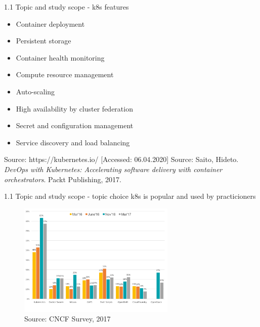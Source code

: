 \documentclass{beamer}
\begin{document}
\begin{frame}{1.1 Topic and study scope - k8s features}%
\begin{itemize}
	\item Container deployment
	\item Persistent storage
	\item Container health monitoring
	\item Compute resource management
	\item Auto-scaling
	\item High availability by cluster federation
	\item Secret and configuration management
	\item Service discovery and load balancing
\end{itemize}

\tiny{Source: https://kubernetes.io/ [Accessed: 06.04.2020]} 
\tiny{Source: Saito, Hideto. \textit{DevOps with Kubernetes: Accelerating software delivery with container orchestrators}. Packt Publishing, 2017.}
\end{frame}

\begin{frame}{1.1 Topic and study scope - topic choice}%
k8s is popular and used by practicioners
\begin{figure}
	\includegraphics[width=7.5cm]{figures/cncf-container-orchestrators.png}
	\label{fig:cncf-container-orchestrators}
	\\
	\tiny{Source: CNCF Survey, 2017}
\end{figure}
\end{frame}
	
\end{document}
